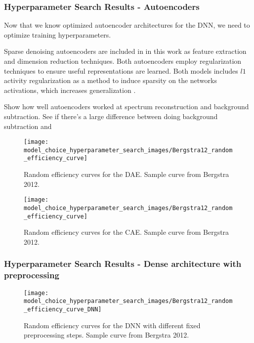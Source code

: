 \subsubsection{Hyperparameter Search Results - Autoencoders}

Now that we know optimized autoencoder architectures for the DNN, we need to optimize training hyperparameters. 



Sparse denoising autoencoders are included in in this work as feature extraction and dimension reduction techniques. Both autoencoders employ regularization techniques to ensure useful representations are learned. Both models includes $l1$ activity regularization as a method to induce sparsity on the networks activations, which increases generalization \cite{Goodfellow-et-al-2016}. 

Show how well autoencoders worked at spectrum reconstruction and background subtraction. See if there's a large difference between doing background subtraction and 



\begin{figure}[H]
	\centering
	\texttt{[image: model\_choice\_hyperparameter\_search\_images/Bergstra12\_random\_efficiency\_curve]}
	\caption{Random efficiency curves for the DAE. Sample curve from Bergstra 2012.}
	\label{fig:random_efficiency_curve_DAE}
\end{figure}


\begin{figure}[H]
	\centering
	\texttt{[image: model\_choice\_hyperparameter\_search\_images/Bergstra12\_random\_efficiency\_curve]}
	\caption{Random efficiency curves for the CAE. Sample curve from Bergstra 2012.}
	\label{fig:random_efficiency_curve_CAE}
\end{figure}

\subsubsection{Hyperparameter Search Results - Dense architecture with preprocessing }

\begin{figure}[H]
	\centering
	\texttt{[image: model\_choice\_hyperparameter\_search\_images/Bergstra12\_random\_efficiency\_curve\_DNN]}
	\caption{Random efficiency curves for the DNN with different fixed preprocessing steps. Sample curve from Bergstra 2012.}
	\label{fig:random_efficiency_curve_DNN_preprocessing}
\end{figure}

